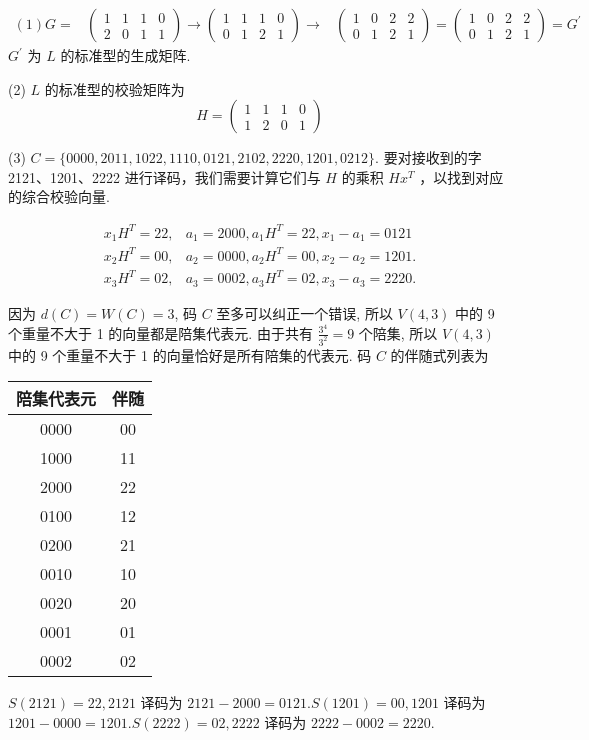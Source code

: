 \begin{solution}
$$
\begin{aligned}
(1) G= & \left(\begin{array}{llll}
1 & 1 & 1 & 0 \\
2 & 0 & 1 & 1
\end{array}\right) \rightarrow\left(\begin{array}{llll}
1 & 1 & 1 & 0 \\
0 & 1 & 2 & 1
\end{array}\right) \rightarrow 
& \left(\begin{array}{llll}
1 & 0 & 2 & 2 \\
0 & 1 & 2 & 1
\end{array}\right)=\left(\begin{array}{ll|ll}
1 & 0 & 2 & 2 \\
0 & 1 & 2 & 1
\end{array}\right)=G^{\prime}
\end{aligned}
$$
$ G^{\prime} $ 为 $ L $ 的标准型的生成矩阵.

(2) $ L $ 的标准型的校验矩阵为
$$
H=\left(\begin{array}{llll}
1 & 1 & 1 & 0 \\
1 & 2 & 0 & 1
\end{array}\right)
$$

(3)
$C=\{0000,2011,1022,1110,0121,2102,2220,1201,0212\} .$
要对接收到的字 2121、1201、2222 进行译码，我们需要计算它们与 $ H $ 的乘积 $ H x^{T} $ ，以找到对应的综合校验向量.

$$ \begin{array}{ll}x_{1} H^{T}=22, & a_{1}=2000, a_{1} H^{T}=22, x_{1}-a_{1}=0121 \\ x_{2} H^{T}=00, & a_{2}=0000, a_{2} H^{T}=00, x_{2}-a_{2}=1201 . \\ x_{3} H^{T}=02, & a_{3}=0002, a_{3} H^{T}=02, x_{3}-a_{3}=2220 .\end{array} $$

因为 $ d(C)=W(C)=3 $, 码 $ C $ 至多可以纠正一个错误, 所以 $ V(4,3) $ 中的 9 个重量不大于 1 的向量都是陪集代表元. 由于共有 $ \frac{3^{4}}{3^{2}}=9 $ 个陪集, 所以 $ V(4,3) $ 中的 9 个重量不大于 1 的向量恰好是所有陪集的代表元. 码 $ C $ 的伴随式列表为
\begin{center}
\begin{tabular}{cc}
\hline 陪集代表元 & 伴随 \\
\hline 0000 & 00 \\
1000 & 11 \\
2000 & 22 \\
0100 & 12 \\
0200 & 21 \\
0010 & 10 \\
0020 & 20 \\
0001 & 01 \\
0002 & 02 \\
\hline
\end{tabular}
\end{center}
$ S(2121)=22,2121 $ 译码为 $ 2121-2000=0121 . S(1201)=00,1201 $ 译码为 $ 1201-0000=1201 . S(2222)=02,2222 $ 译码为 $ 2222-0002=2220 $.
\end{solution}

